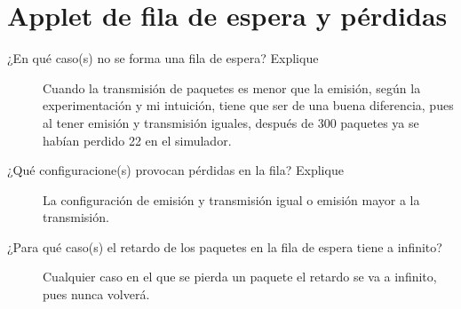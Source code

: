 
\section*{Applet de fila de espera y p\'erdidas}

\begin{description}
	\item[¿En qué caso(s) no se forma una fila de espera? Explique] 
	Cuando la transmisión de paquetes es menor que la emisión, según la experimentación y mi intuición, tiene que ser de una buena diferencia, pues al tener emisión y transmisión iguales, después de 300 paquetes ya se habían perdido 22 en el simulador.
	
	\item[¿Qu\'e configuracione(s) provocan p\'erdidas en la fila? Explique]
	La configuración de emisión y transmisión igual o emisión mayor a la transmisión.
	
	\item[¿Para qu\'e caso(s) el retardo de los paquetes en la fila de espera tiene a infinito?]
	Cualquier caso en el que se pierda un paquete el retardo se va a infinito, pues nunca volverá.
\end{description}